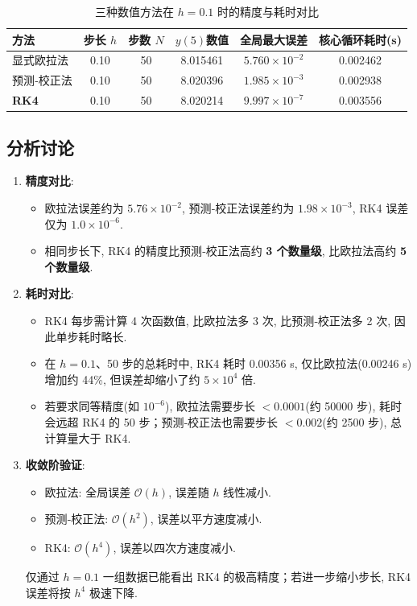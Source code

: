 \documentclass[12pt,a4paper]{ctexart}
\begin{document}
\begin{table}[H]
    \centering
    \caption{三种数值方法在 $h=0.1$ 时的精度与耗时对比}
    \label{tab:compare}
    \begin{tabular}{@{}lccccc@{}}
        \toprule
        方法 & 步长 $h$ & 步数 $N$ & $y(5)$数值 & 全局最大误差 & 核心循环耗时(s) \\
        \midrule
        显式欧拉法   & 0.10 & 50 & 8.015461 & $5.760\times10^{-2}$ & 0.002462 \\
        预测‑校正法  & 0.10 & 50 & 8.020396 & $1.985\times10^{-3}$ & 0.002938 \\
        \textbf{RK4} & 0.10 & 50 & 8.020214 & \textbf{$9.997\times10^{-7}$} & 0.003556 \\
        \bottomrule
    \end{tabular}
\end{table}

\subsection{分析讨论}
\begin{enumerate}
    \item \textbf{精度对比}: 
    \begin{itemize}
        \item 欧拉法误差约为 $5.76\times10^{-2}$, 预测‑校正法误差约为 $1.98\times10^{-3}$, RK4 误差仅为 $1.0\times10^{-6}$. 
        \item 相同步长下, RK4 的精度比预测‑校正法高约 \textbf{3 个数量级}, 比欧拉法高约 \textbf{5 个数量级}. 
    \end{itemize}
    
    \item \textbf{耗时对比}: 
    \begin{itemize}
        \item RK4 每步需计算 4 次函数值, 比欧拉法多 3 次, 比预测‑校正法多 2 次, 因此单步耗时略长. 
        \item 在 $h=0.1$、50 步的总耗时中, RK4 耗时 0.00356 s, 仅比欧拉法(0.00246 s)增加约 44\%, 但误差却缩小了约 $5\times10^4$ 倍. 
        \item 若要求同等精度(如 $10^{-6}$), 欧拉法需要步长 $<0.0001$(约 50000 步), 耗时会远超 RK4 的 50 步；预测‑校正法也需要步长 $<0.002$(约 2500 步), 总计算量大于 RK4. 
    \end{itemize}
    
    \item \textbf{收敛阶验证}: 
    \begin{itemize}
        \item 欧拉法: 全局误差 $\mathcal{O}(h)$, 误差随 $h$ 线性减小. 
        \item 预测‑校正法: $\mathcal{O}(h^2)$, 误差以平方速度减小. 
        \item RK4: $\mathcal{O}(h^4)$, 误差以四次方速度减小. 
    \end{itemize}
    仅通过 $h=0.1$ 一组数据已能看出 RK4 的极高精度；若进一步缩小步长, RK4 误差将按 $h^4$ 极速下降. 
\end{enumerate}
\end{document}
